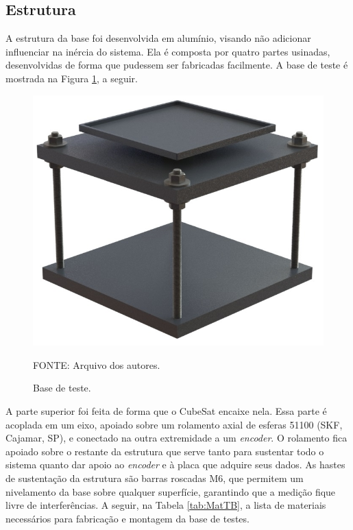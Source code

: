 \documentclass[
	12pt,				%
	openany,			%
	twoside,			%
	a4paper,			%
	english,			%
	french,				%
	spanish,			%
	brazil,				%
	oldfontcommands
	]{abntex2}
\begin{document}
\subsection{Estrutura}

A estrutura da base foi desenvolvida em alumínio, visando não adicionar influenciar na inércia do sistema. Ela é composta por quatro partes usinadas, desenvolvidas de forma que pudessem ser fabricadas facilmente. A base de teste é mostrada na Figura \ref{fig:ProtoTB}, a seguir.

\begin{figure}[th]
	\caption{Base de teste.}
	\centering
	\includegraphics[width=0.6\linewidth]{./figs/Test_Base}
	
	\begin{small}
		FONTE: Arquivo dos autores.
	\end{small}
	\label{fig:ProtoTB}
\end{figure}

\newpage

A parte superior foi feita de forma que o CubeSat encaixe nela. Essa parte é acoplada em um eixo, apoiado sobre um rolamento axial de esferas 51100 (SKF, Cajamar, SP), e conectado na outra extremidade a um \textit{encoder}. O rolamento fica apoiado sobre o restante da estrutura que serve tanto para sustentar todo o sistema quanto dar apoio ao \textit{encoder} e à placa que adquire seus dados. As hastes de sustentação da estrutura são barras roscadas M6, que permitem um nivelamento da base sobre qualquer superfície, garantindo que a medição fique livre de interferências. A seguir, na Tabela \ref{tab:MatTB}, a lista de materiais necessários para fabricação e montagem da base de testes.
\end{document}
